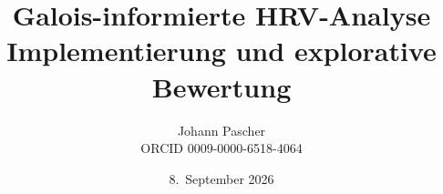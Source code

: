 \documentclass[11pt,a4paper]{report}
\title{Galois-informierte HRV-Analyse\\[0.5em]
  \large Implementierung und explorative Bewertung}
\date{8.~September 2026}
\author{Johann Pascher\\\small ORCID 0009-0000-6518-4064}
\begin{document}
\renewcommand{\thechapter}{}
\renewcommand{\thesection}{\arabic{section}}
\maketitle
\tableofcontents

\end{document}
